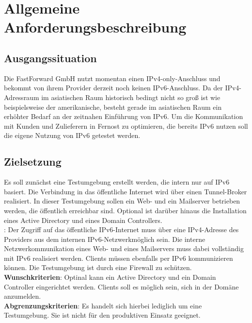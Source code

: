 \section{Allgemeine Anforderungsbeschreibung}

\subsection{Ausgangssituation}

Die FastForward GmbH nutzt momentan einen IPv4-only-Anschluss und bekommt von ihrem Provider derzeit noch keinen IPv6-Anschluss. Da der IPv4-Adressraum im asiatischen Raum historisch bedingt nicht so groß ist wie beispielsweise der amerikanische, besteht gerade im asiatischen Raum ein erhöhter Bedarf an der zeitnahen Einführung von IPv6. Um die Kommunikation mit Kunden und Zulieferern in Fernost zu optimieren, die bereits IPv6 nutzen soll die eigene Nutzung von IPv6 getestet werden.

\subsection{Zielsetzung}

Es soll zunächst eine Testumgebung erstellt werden, die intern nur auf IPv6 basiert. Die Verbindung in das öffentliche Internet wird über einen Tunnel-Broker realisiert. In dieser Testumgebung sollen ein Web- und ein Mailserver betrieben werden, die öffentlich erreichbar sind. Optional ist darüber hinaus die Installation eines Active Directory und eines Domain Controllers.\\

: Der Zugriff auf das öffentliche IPv6-Internet muss über eine IPv4-Adresse des Providers aus dem internen IPv6-Netzwerkmöglich sein. Die interne Netzwerkommunikation eines Web- und eines Mailservers muss dabei vollständig mit IPv6 realisiert werden. Clients müssen ebenfalls per IPv6 kommunizieren können. Die Testumgebung ist durch eine Firewall zu schützen. \\
{\bf Wunschkriterien}: Optinal kann ein Active Directory und ein Domain Controller eingerichtet werden. Clients soll es möglich sein, sich in der Domäne anzumelden. \\
{\bf Abgrenzungskriterien}: Es handelt sich hierbei lediglich um eine Testumgebung. Sie ist nicht für den produktiven Einsatz geeignet.
